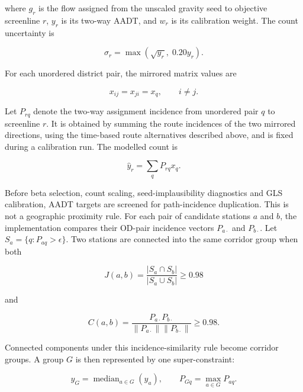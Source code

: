 \documentclass[11pt,a4paper]{article}
\begin{document}
where $g_r$ is the flow assigned from the unscaled gravity seed to objective
screenline $r$, $y_r$ is its two-way AADT, and $w_r$ is its calibration weight.
The count uncertainty is

\begin{equation}
\sigma_r=\max\left(\sqrt{y_r},\;0.20y_r\right).
\label{eq:district-count-variance}
\end{equation}

For each unordered district pair, the mirrored matrix values are

\begin{equation}
x_{ij}=x_{ji}=x_q,\qquad i\ne j.
\label{eq:symmetric-demand}
\end{equation}

Let $P_{rq}$ denote the two-way assignment incidence from unordered pair $q$ to
screenline $r$. It is obtained by summing the route incidences of the two
mirrored directions, using the time-based route alternatives described above,
and is fixed during a calibration run. The modelled count is

\begin{equation}
\hat{y}_r = \sum_q P_{rq}x_q.
\label{eq:district-odme}
\end{equation}

Before beta selection, count scaling, seed-implausibility diagnostics and GLS
calibration, AADT targets are screened for path-incidence duplication. This is
not a geographic proximity rule. For each pair of candidate stations $a$ and
$b$, the implementation compares their OD-pair incidence vectors
$P_{a\cdot}$ and $P_{b\cdot}$. Let
$S_a=\{q:P_{aq}>\epsilon\}$. Two stations are connected into the same corridor
group when both

\begin{equation}
J(a,b)=\frac{|S_a\cap S_b|}{|S_a\cup S_b|}\ge 0.98
\end{equation}

and

\begin{equation}
C(a,b)=
\frac{P_{a\cdot}P_{b\cdot}}
{\|P_{a\cdot}\|\|P_{b\cdot}\|}
\ge 0.98 .
\end{equation}

Connected components under this incidence-similarity rule become corridor
groups. A group $G$ is then represented by one super-constraint:

\begin{equation}
y_G=\operatorname{median}_{a\in G}(y_a),\qquad
P_{Gq}=\max_{a\in G}P_{aq}.
\end{equation}
\end{document}
